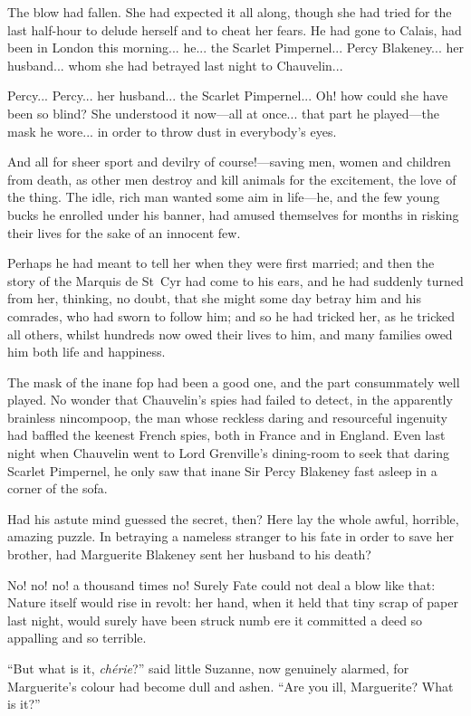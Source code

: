 The blow had fallen. She had expected it all along, though she had tried for the last half-hour to delude herself and to cheat her fears. He had gone to Calais, had been in London this morning... he... the Scarlet Pimpernel... Percy Blakeney... her husband... whom she had betrayed last night to Chauvelin...

Percy... Percy... her husband... the Scarlet Pimpernel... Oh! how could she have been so blind? She understood it now---all at once... that part he played---the mask he wore... in order to throw dust in everybody's eyes.

And all for sheer sport and devilry of course!---saving men, women and children from death, as other men destroy and kill animals for the excitement, the love of the thing. The idle, rich man wanted some aim in life---he, and the few young bucks he enrolled under his banner, had amused themselves for months in risking their lives for the sake of an innocent few.

Perhaps he had meant to tell her when they were first married; and then the story of the Marquis de St~Cyr had come to his ears, and he had suddenly turned from her, thinking, no doubt, that she might some day betray him and his comrades, who had sworn to follow him; and so he had tricked her, as he tricked all others, whilst hundreds now owed their lives to him, and many families owed him both life and happiness.

The mask of the inane fop had been a good one, and the part consummately well played. No wonder that Chauvelin's spies had failed to detect, in the apparently brainless nincompoop, the man whose reckless daring and resourceful ingenuity had baffled the keenest French spies, both in France and in England. Even last night when Chauvelin went to Lord Grenville's dining-room to seek that daring Scarlet Pimpernel, he only saw that inane Sir Percy Blakeney fast asleep in a corner of the sofa.

Had his astute mind guessed the secret, then? Here lay the whole awful, horrible, amazing puzzle. In betraying a nameless stranger to his fate in order to save her brother, had Marguerite Blakeney sent her husband to his death?

No! no! no! a thousand times no! Surely Fate could not deal a blow like that: Nature itself would rise in revolt: her hand, when it held that tiny scrap of paper last night, would surely have been struck numb ere it committed a deed so appalling and so terrible.

\enquote{But what is it, \textit{chérie}?} said little Suzanne, now genuinely alarmed, for Marguerite's colour had become dull and ashen. \enquote{Are you ill, Marguerite? What is it?}

